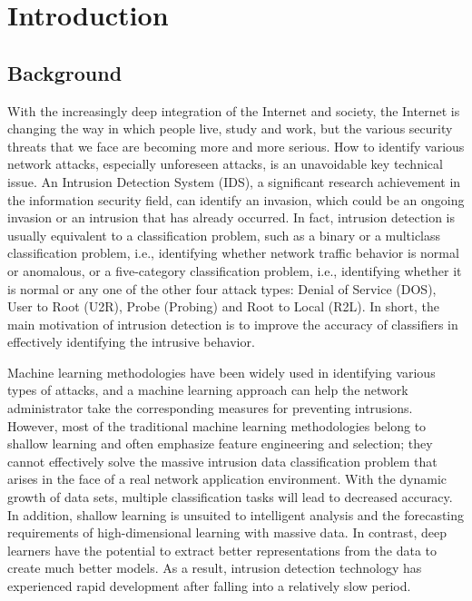 
\newpage
{} %

\chapter{Introduction}
\vspace{-18pt}
\section{Background}\label{sec:bkgrnd}%
\vspace{-18pt}
With the increasingly deep integration of the Internet and society, the Internet is changing the way in which people live, study and work, but the various security threats that we face are becoming more and more serious. How to identify various network attacks, especially unforeseen attacks, is an unavoidable key technical issue. An Intrusion Detection System (IDS), a significant research achievement in the information security field, can identify an invasion, which could be an ongoing invasion or an intrusion that has already occurred. In fact, intrusion detection is usually equivalent to a classification problem, such as a binary or a multiclass classification problem, i.e., identifying whether network traffic behavior is normal or anomalous, or a five-category classification problem, i.e., identifying whether it is normal or any one of the other four attack types: Denial of Service (DOS), User to Root (U2R), Probe (Probing) and Root to Local (R2L). In short, the main motivation of intrusion detection is to improve the accuracy of classifiers in effectively identifying the intrusive behavior.\par
Machine learning methodologies have been widely used in identifying various types of attacks, and a machine learning approach can help the network administrator take the corresponding measures for preventing intrusions. However, most of the traditional machine learning methodologies belong to shallow learning and often emphasize feature engineering and selection; they cannot effectively solve the massive intrusion data classification problem that arises in the face of a real network application environment. With the dynamic growth of data sets, multiple classification tasks will lead to decreased accuracy. In addition, shallow learning is unsuited to intelligent analysis and the forecasting requirements of high-dimensional learning with massive data. In contrast, deep learners have the potential to extract better representations from the data to create much better models. As a result, intrusion detection technology has experienced rapid development after falling into a relatively slow period.\cite{yin2017deep}%
